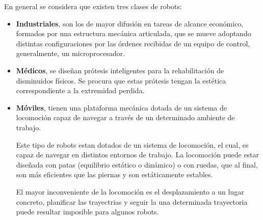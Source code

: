 En general se considera que existen tres clases de robots:
\begin{itemize}
\item \textbf{Industriales}, son los de mayor difusión en tareas de alcance económico, formados por una estructura mecánica articulada, que se mueve adoptando distintas configuraciones por las órdenes recibidas de un equipo de control, generalmente, un microprocesador.
\item \textbf{Médicos}, se diseñan prótesis inteligentes para la rehabilitación de disminuidos físicos. Se procura que estas prótesis tengan la estética correspondiente a la extremidad perdida.
\item \textbf{Móviles}, tienen una plataforma mecánica dotada de un sistema de locomoción capaz de navegar a través de un determinado ambiente de trabajo.

Este tipo de robots estan dotados de un sistema de locomoción, el cual, es capaz de navegar en distintos entornos de trabajo. La locomoción puede estar diseñada con patas (equilibrio estático o dinámico) o con ruedas, que al final, son más eficientes que las piernas y son estáticamente estables. 

El mayor inconveniente de la locomoción es el desplazamiento a un lugar concreto, planificar las trayectrias y seguir la una determinada trayectoria puede resultar imposible para algunos robots.


\end{itemize}
